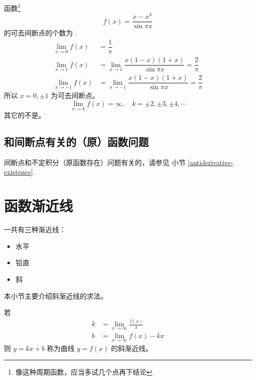 \begin{example}
    函数\footnote{像这种周期函数，应当多试几个点再下结论}
    \[
        f(x) = \dfrac{x - x^3}{\sin \pi x}
    \]
    的可去间断点的个数为
    \cite[page 62, question (2009)]{yc}.
    \begin{align*}
        \lim_{x \to 0}  f(x) &= \dfrac{1}{\pi}\\
        \lim_{x \to 1}  f(x) &= \lim_{x \to  1} \dfrac{x(1-x)(1+x)}{\sin \pi x} = \dfrac{2}{\pi}\\
        \lim_{x \to -1} f(x) &= \lim_{x \to -1} \dfrac{x(1-x)(1+x)}{\sin \pi x} = \dfrac{2}{\pi}
    \end{align*}
    所以 $x = 0, \pm 1$ 为可去间断点。
    \[
        \lim_{x \to k} f(x) = \infty, \quad k = \pm 2, \pm 3, \pm 4, \cdots
    \]
    其它的不是。
\end{example}

\subsection{和间断点有关的（原）函数问题}

间断点和不定积分（原函数存在）问题有关的，请参见 小节 \ref{antiderivative-existence}.

\section{函数渐近线}

一共有三种渐近线：
\begin{itemize}
    \item 水平
    \item 铅直
    \item 斜
\end{itemize}
本小节主要介绍斜渐近线的求法。

\begin{definition}
    若 
    \begin{align*}
        k &= \lim_{x \to \infty} \frac{f(x)}{x} \\
        b &= \lim_{x \to \infty} f(x) - kx
    \end{align*}
    则 $y = kx + b$ 称为曲线 $y = f(x)$ 的斜渐近线。
\end{definition}

